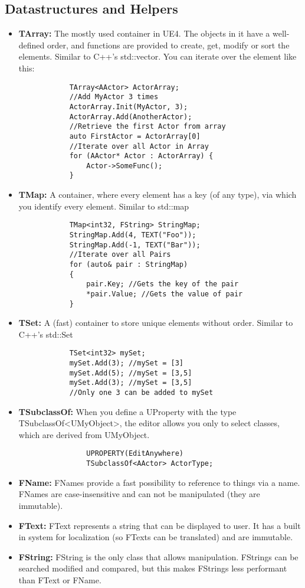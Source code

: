 \documentclass[10pt,a4paper]{article}
\begin{document}
\begin{multicols*}{2}
	\subsection{Datastructures and Helpers}
	\begin{itemize}
		\item \textbf{TArray:} The mostly used container in UE4. The objects in it have a well-defined order, and functions are provided to create, get, modify or sort the elements. Similar to C++'s std::vector. You can iterate over the element like this:
		\begin{verbatim}
			TArray<AActor> ActorArray;
			//Add MyActor 3 times
			ActorArray.Init(MyActor, 3);
			ActorArray.Add(AnotherActor);
			//Retrieve the first Actor from array
			auto FirstActor = ActorArray[0]
			//Iterate over all Actor in Array
			for (AActor* Actor : ActorArray) {
			    Actor->SomeFunc(); 
			}
		\end{verbatim}
		\item \textbf{TMap:} A container, where every element has a key (of any type), via which you identify every element. Similar to std::map
		\begin{verbatim}
			TMap<int32, FString> StringMap;
			StringMap.Add(4, TEXT("Foo"));
			StringMap.Add(-1, TEXT("Bar"));
			//Iterate over all Pairs
			for (auto& pair : StringMap)
			{
			    pair.Key; //Gets the key of the pair
			    *pair.Value; //Gets the value of pair
			}
		\end{verbatim}
		\item \textbf{TSet:} A (fast) container to store unique elements without order. Similar to C++'s std::Set
			\begin{verbatim}
			TSet<int32> mySet;
			mySet.Add(3); //mySet = [3]
			mySet.Add(5); //mySet = [3,5]
			mySet.Add(3); //mySet = [3,5]
			//Only one 3 can be added to mySet
			\end{verbatim}
		\item \textbf{TSubclassOf:} When you define a UProperty with the type TSubclassOf{\textless}UMyObject{\textgreater}, the editor allows you only to select classes, which are derived from UMyObject.
			\begin{verbatim}
				UPROPERTY(EditAnywhere)
				TSubclassOf<AActor> ActorType;
			\end{verbatim}
		\item \textbf{FName:} FNames provide a fast possibility to reference to things via a name. FNames are case-insensitive and can not be manipulated (they are immutable).
		\item \textbf{FText:} FText represents a string that can be displayed to user. It has a built in system for localization (so FTexts can be translated) and are immutable.
		\item \textbf{FString:} FString is the only class that allows manipulation. FStrings can be searched modified and compared, but this makes FStrings less performant than FText or FName.
	\end{itemize}


\end{multicols*}
\end{document}

